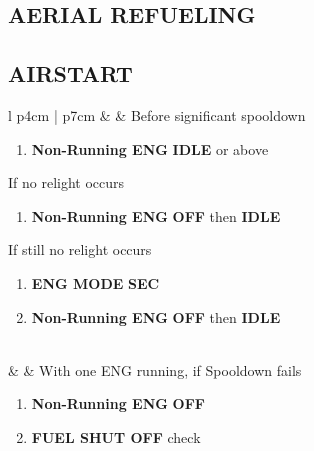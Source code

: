 \documentclass[8pt,usenames,dvipsnames,twoside]{article}
\begin{document}
		\clearpage
		
		\subsection{AERIAL REFUELING}
		
		\clearpage
		
		\subsection{AIRSTART}
		\begin{center}
			\begin{longtable}{l p{4cm} | p{7cm}}
				\toprule
				\textbullet &  & Before significant spooldown
				\begin{minipage}[t]{\linewidth}
					\vspace{-7pt}
					\begin{enumerate}[label=(\alph*)]
						\item \textbf{Non-Running ENG} \dotfill \textbf{IDLE} or above
					\end{enumerate}
					If no relight occurs
					\begin{enumerate}[label=(\alph*), resume]
						\vspace{-7pt}
						\item \textbf{Non-Running ENG} \dotfill \textbf{OFF} then \textbf{IDLE}
					\end{enumerate}
					\vspace{-7pt}
					If still no relight occurs
					\begin{enumerate}[label=(\alph*), resume]
						\vspace{-7pt}
						\item \textbf{ENG MODE} \dotfill \textbf{SEC}
						\item \textbf{Non-Running ENG} \dotfill \textbf{OFF} then \textbf{IDLE}
					\end{enumerate}
				\end{minipage} \\
				\midrule
				\textbullet &  & 
				With one ENG running, if Spooldown fails
				\begin{minipage}[t]{\linewidth}
					\vspace{-7pt}
					\begin{enumerate}[label=(\alph*)]
						\item \textbf{Non-Running ENG} \dotfill \textbf{OFF}
						\item \textbf{FUEL SHUT OFF} \dotfill check

\end{enumerate}
\end{minipage}
\end{longtable}
\end{center}
\end{document}
